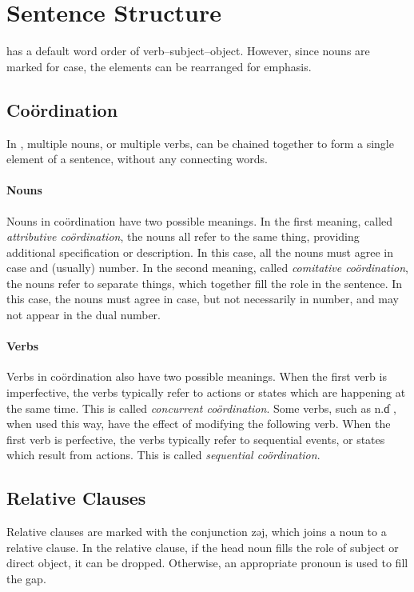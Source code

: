 \section{Sentence Structure}
\Langname{} has a default word order of verb--subject--object. However, since
nouns are marked for case, the elements can be rearranged for emphasis.

\subsection{Coördination}
In \Langname, multiple nouns, or multiple verbs, can be chained together to
form a single element of a sentence, without any connecting words.

\paragraph{Nouns} Nouns in coördination have two possible meanings. In the
first meaning, called \emph{attributive coördination}, the nouns all refer
to the same thing, providing additional specification or description. In this
case, all the nouns must agree in case and (usually) number. In the second
meaning, called \emph{comitative coördination}, the nouns refer to separate
things, which together fill the role in the sentence.  In this case, the nouns
must agree in case, but not necessarily in number, and may not appear in the
dual number.

\paragraph{Verbs} Verbs in coördination also have two possible meanings. When
the first verb is imperfective, the verbs typically refer to actions or states
which are happening at the same time. This is called \emph{concurrent
    coördination}. Some verbs, such as {\ll n.ɗ} , when used
this way, have the effect of modifying the following verb.  When the first verb
is perfective, the verbs typically refer to sequential events, or states which
result from actions. This is called \emph{sequential coördination}.

\subsection{Relative Clauses}
Relative clauses are marked with the conjunction {\ll zəj}, which joins a noun
to a relative clause. In the relative clause, if the head noun fills the role
of subject or direct object, it can be dropped. Otherwise, an appropriate
pronoun is used to fill the gap.

